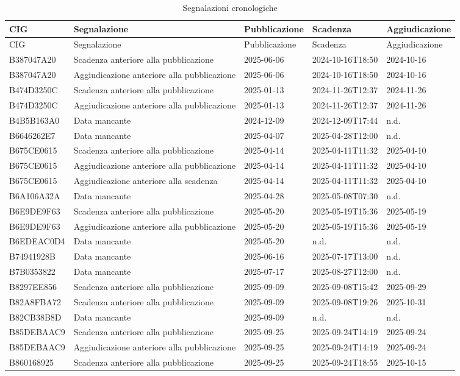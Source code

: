 \begin{longtable}{p{2.3cm}p{4.7cm}p{2.5cm}p{3.2cm}p{2.5cm}}
\caption{Segnalazioni cronologiche}\\
\toprule
CIG & Segnalazione & Pubblicazione & Scadenza & Aggiudicazione \\
\midrule
\endfirsthead
\toprule
CIG & Segnalazione & Pubblicazione & Scadenza & Aggiudicazione \\
\midrule
\endhead
B387047A20 & Scadenza anteriore alla pubblicazione & 2025-06-06 & 2024-10-16T18:50 & 2024-10-16 \\
B387047A20 & Aggiudicazione anteriore alla pubblicazione & 2025-06-06 & 2024-10-16T18:50 & 2024-10-16 \\
B474D3250C & Scadenza anteriore alla pubblicazione & 2025-01-13 & 2024-11-26T12:37 & 2024-11-26 \\
B474D3250C & Aggiudicazione anteriore alla pubblicazione & 2025-01-13 & 2024-11-26T12:37 & 2024-11-26 \\
B4B5B163A0 & Data mancante & 2024-12-09 & 2024-12-09T17:44 & n.d. \\
B6646262E7 & Data mancante & 2025-04-07 & 2025-04-28T12:00 & n.d. \\
B675CE0615 & Scadenza anteriore alla pubblicazione & 2025-04-14 & 2025-04-11T11:32 & 2025-04-10 \\
B675CE0615 & Aggiudicazione anteriore alla pubblicazione & 2025-04-14 & 2025-04-11T11:32 & 2025-04-10 \\
B675CE0615 & Aggiudicazione anteriore alla scadenza & 2025-04-14 & 2025-04-11T11:32 & 2025-04-10 \\
B6A106A32A & Data mancante & 2025-04-28 & 2025-05-08T07:30 & n.d. \\
B6E9DE9F63 & Scadenza anteriore alla pubblicazione & 2025-05-20 & 2025-05-19T15:36 & 2025-05-19 \\
B6E9DE9F63 & Aggiudicazione anteriore alla pubblicazione & 2025-05-20 & 2025-05-19T15:36 & 2025-05-19 \\
B6EDEAC0D4 & Data mancante & 2025-05-20 & n.d. & n.d. \\
B74941928B & Data mancante & 2025-06-16 & 2025-07-17T13:00 & n.d. \\
B7B0353822 & Data mancante & 2025-07-17 & 2025-08-27T12:00 & n.d. \\
B8297EE856 & Scadenza anteriore alla pubblicazione & 2025-09-09 & 2025-09-08T15:42 & 2025-09-29 \\
B82A8FBA72 & Scadenza anteriore alla pubblicazione & 2025-09-09 & 2025-09-08T19:26 & 2025-10-31 \\
B82CB38B8D & Data mancante & 2025-09-09 & n.d. & n.d. \\
B85DEBAAC9 & Scadenza anteriore alla pubblicazione & 2025-09-25 & 2025-09-24T14:19 & 2025-09-24 \\
B85DEBAAC9 & Aggiudicazione anteriore alla pubblicazione & 2025-09-25 & 2025-09-24T14:19 & 2025-09-24 \\
B860168925 & Scadenza anteriore alla pubblicazione & 2025-09-25 & 2025-09-24T18:55 & 2025-10-15 \\
\bottomrule
\end{longtable}
